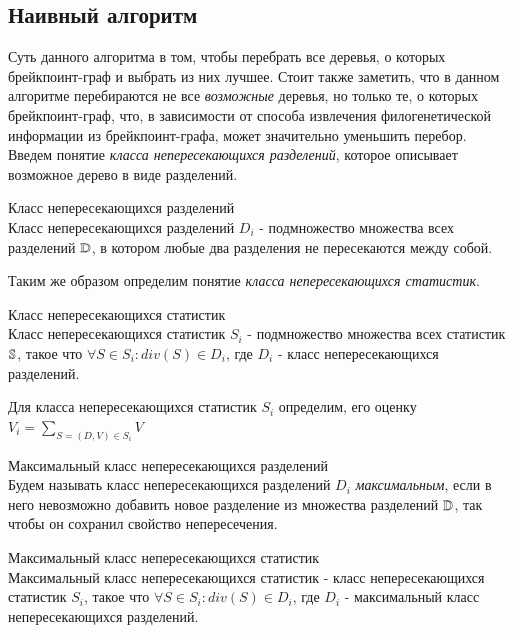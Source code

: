 \subsection{Наивный алгоритм}
Суть данного алгоритма в том, чтобы перебрать все деревья, о которых  брейкпоинт-граф и выбрать из них лучшее.
Стоит также заметить, что в данном алгоритме перебираются не все \emph{возможные} деревья, но только те, о которых  брейкпоинт-граф,
что, в зависимости от способа извлечения филогенетической информации из брейкпоинт-графа, может значительно уменьшить перебор.
Введем понятие \textit{класса непересекающихся разделений}, которое описывает возможное дерево в виде разделений.
\begin{define}{Класс непересекающихся разделений} \\
  Класс непересекающихся разделений $D_i$ - подмножество множества всех разделений $\mathbb{D}$,
  в котором любые два разделения не пересекаются между собой.
\end{define}

Таким же образом определим понятие \textit{класса непересекающихся статистик}.
\begin{define}{Класс непересекающихся статистик}\\
  Класс непересекающихся статистик $S_i$ - подмножество множества всех статистик $\mathbb{S}$,
  такое что $\forall S \in S_i: div(S) \in D_i$,
  где $D_i$ -  класс непересекающихся разделений.
\end{define}

Для класса непересекающихся статистик $S_i$ определим, его оценку $V_i = \sum\nolimits_{S = (D, V) \in S_i} V$

\begin{define}{Максимальный класс непересекающихся разделений} \\
  Будем называть класс непересекающихся разделений $D_i$ \textit{максимальным},
  если в него невозможно добавить новое разделение из множества разделений $\mathbb{D}$,
  так чтобы он сохранил свойство непересечения.
\end{define}

\begin{define}{Максимальный класс непересекающихся статистик} \\
  Максимальный класс непересекающихся статистик - класс непересекающихся статистик $S_i$,
  такое что $\forall S \in S_i: div(S) \in D_i$,
  где $D_i$ - максимальный класс непересекающихся разделений.
\end{define}


